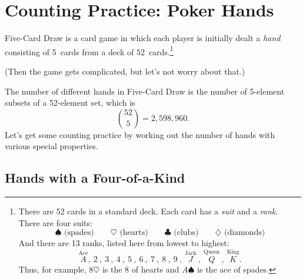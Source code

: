 \begin{problems}

\practiceproblems
{}


\classproblems
{}

\homeworkproblems
{}

\examproblems
{}

\end{problems}


\section{Counting Practice: Poker Hands}\label{poker_hands_sec}

Five-Card Draw is a card game in which each player is initially dealt
a \emph{hand} consisting of 5~cards from a deck of
52~cards.\footnote{There are 52 cards in a standard deck.  Each card
  has a \emph{suit} and a \emph{rank}.  There are four suits:
%
\[
\spadesuit   \text{ (spades)} \qquad
\heartsuit   \text{ (hearts)} \qquad
\clubsuit    \text{ (clubs)} \qquad
\diamondsuit \text{ (diamonds)}
\]
%
And there are 13 ranks, listed here from lowest to highest:
%
\[
\stackrel{\text{Ace}}{A},\
2\ ,\ 3\ ,\ 4\ ,\ 5\ ,\ 6\ ,\ 7\ ,\ 8\ ,\ 9\ ,\
\stackrel{\text{Jack}}{J}\ ,\
\stackrel{\text{Queen}}{Q}\ ,\
\stackrel{\text{King}}{K}.
\]
%
Thus, for example, $8 \heartsuit$ is the 8 of hearts and $A
\spadesuit$ is the ace of spades.}  \begin{editingnotes}
(Then the game gets complicated,
but let's not worry about that.)
\end{editingnotes}  The number of different hands in
Five-Card Draw is the number of 5-element subsets of a 52-element set,
which is
%
\[
\binom{52}{5} = 2,598,960.
\]
%
Let's get some counting practice by working out the number of hands
with various special properties.

\subsection{Hands with a Four-of-a-Kind}


